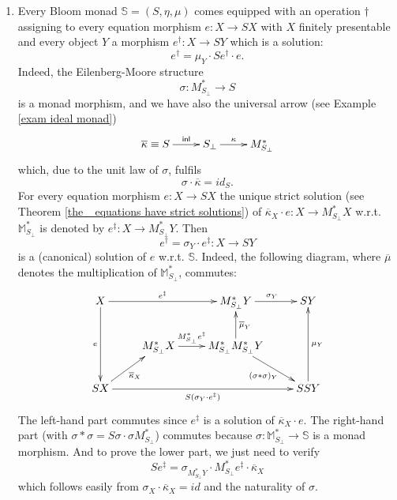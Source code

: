 \documentclass{LMCS}
\theoremstyle{plain}
\theoremstyle{definition}
\numberwithin{equation}{section}
\begin{document}
\begin{rem}
\begin{enumerate}
\item Every Bloom monad $\mathbb S=(S,\eta,\mu)$ comes equipped with an operation $\dagger$ assigning to every equation morphism $e:X\to SX$ with $X$ finitely presentable and every object $Y$ a morphism $e^\dag:X\to SY$ which is a solution:
$$e^\dag=\mu_Y\cdot Se^\dag\cdot e.$$
Indeed, the Eilenberg-Moore structure
$$\sigma:M^*_{S_\bot}\to S$$
is a monad morphism, and we have also the universal arrow (see Example \ref{exam ideal monad})
$$\xymatrix{\overline \kappa\equiv S\ar[r]^-{\mathsf{inl}}&S_\bot\ar[r]^-\kappa&M^*_{S_\bot}}$$
which, due to the unit law of $\sigma $, fulfils
\begin{equation}\label{eq g.kappa=id}
\sigma\cdot \overline \kappa=id_S.
\end{equation}
For every equation morphism $e:X\to SX$ the unique strict solution (see Theorem \ref{the_ equations have strict solutions}) of $\overline{\kappa}_X\cdot e:X\to M^*_{S_\bot}X$ w.r.t. $\mathbb M^*_{S_\bot}$ is denoted by $e^\ddag:X\to M^*_{S_\bot}Y$. Then
$$e^\dag=\sigma_Y\cdot e^\ddag:X\to SY$$
is a (canonical) solution of $e$ w.r.t. $\mathbb S$. Indeed, the following diagram, where $\overline \mu$ denotes the multiplication of $\mathbb M^*_{S_\bot}$, commutes: 
$$\xymatrix{
X\ar[rr]^-{e^\ddag}\ar[dd]_-e&&M^*_{S_\bot}Y\ar[r]^{\sigma_Y}&SY\\
&M^*_{S_\bot}X\ar[r]^-{M^*_{S_\bot}e^\ddag}&M^*_{S_\bot}M^*_{S_\bot}Y\ar[u]_-{\overline \mu_Y}\ar[rd]_-{(\sigma *\sigma)_Y}\\
SX\ar[ur]_-{\overline{\kappa}_X}\ar[rrr]_-{S(\sigma_Y\cdot e^\ddag)}&&&SSY\ar[uu]_-{\mu_Y}
}$$
The left-hand part commutes since $e^\ddag$ is a solution of $\overline{\kappa}_X\cdot e$. The right-hand part (with $\sigma*\sigma=S\sigma\cdot\sigma M^*_{S_\bot}$) commutes because $\sigma:\mathbb M^*_{S_\bot}\to \mathbb S$ is a monad morphism. And to prove the lower part, we just need to verify
$$Se^\ddag=\sigma_{M^*_{S_\bot}Y}\cdot M^*_{S_\bot}e^\ddag\cdot \overline \kappa_X$$
which follows easily from $\sigma_X\cdot \overline \kappa_X=id$ and
the naturality of $\sigma$.
\end{enumerate}
\end{rem}
\end{document}
